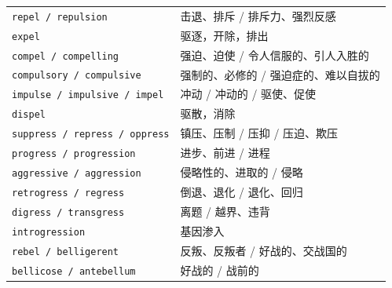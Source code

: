 \documentclass[UTF8,zihao=-4]{ctexart}
\begin{document}
\begin{longtable}{>{\raggedright\arraybackslash}p{5.0cm} >{\raggedright\arraybackslash}p{9.5cm}}
\texttt{repel / repulsion} & 击退、排斥 / 排斥力、强烈反感 \\
\texttt{expel} & 驱逐，开除，排出 \\
\texttt{compel / compelling} & 强迫、迫使 / 令人信服的、引人入胜的 \\
\texttt{compulsory / compulsive} & 强制的、必修的 / 强迫症的、难以自拔的 \\
\texttt{impulse / impulsive / impel} & 冲动 / 冲动的 / 驱使、促使 \\
\texttt{dispel} & 驱散，消除 \\
\texttt{suppress / repress / oppress} & 镇压、压制 / 压抑 / 压迫、欺压 \\
\texttt{progress / progression} & 进步、前进 / 进程 \\
\texttt{aggressive / aggression} & 侵略性的、进取的 / 侵略 \\
\texttt{retrogress / regress} & 倒退、退化 / 退化、回归 \\
\texttt{digress / transgress} & 离题 / 越界、违背 \\
\texttt{introgression} & 基因渗入 \\
\texttt{rebel / belligerent} & 反叛、反叛者 / 好战的、交战国的 \\
\texttt{bellicose / antebellum} & 好战的 / 战前的 \\
\bottomrule
\end{longtable}
\end{document}

